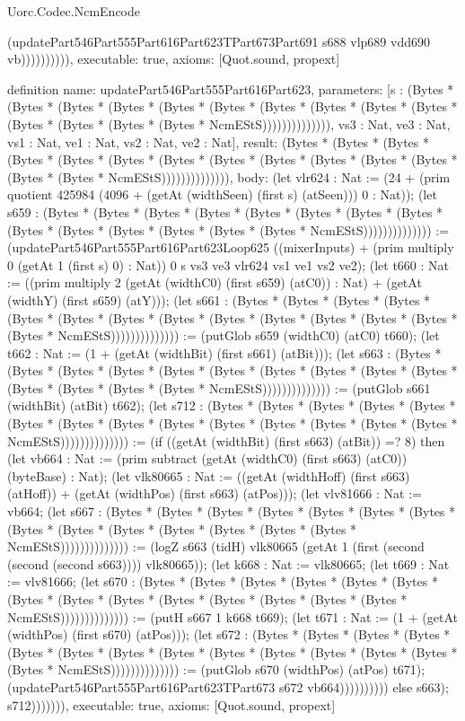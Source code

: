 \begin{lexlean}{Uorc.Codec.NcmEncode}
\begin{semanticmodule}
{(updatePart546Part555Part616Part623TPart673Part691 s688 vlp689 vdd690 vb)))))))))),
  executable: true,
  axioms: [Quot.sound, propext]
}

definition{
  name: updatePart546Part555Part616Part623,
  parameters: [s : (Bytes * (Bytes * (Bytes * (Bytes * (Bytes * (Bytes * (Bytes * (Bytes * (Bytes * (Bytes * (Bytes * (Bytes * (Bytes * (Bytes * NcmEStS)))))))))))))), vs3 : Nat, ve3 : Nat, vs1 : Nat, ve1 : Nat, vs2 : Nat, ve2 : Nat],
  result: (Bytes * (Bytes * (Bytes * (Bytes * (Bytes * (Bytes * (Bytes * (Bytes * (Bytes * (Bytes * (Bytes * (Bytes * (Bytes * (Bytes * NcmEStS)))))))))))))),
  body: (let vlr624 : Nat := (24 + (prim quotient 425984 (4096 + (getAt (widthSeen) (first s) (atSeen))) 0 : Nat)); (let s659 : (Bytes * (Bytes * (Bytes * (Bytes * (Bytes * (Bytes * (Bytes * (Bytes * (Bytes * (Bytes * (Bytes * (Bytes * (Bytes * (Bytes * NcmEStS)))))))))))))) := (updatePart546Part555Part616Part623Loop625 ((mixerInputs) + (prim multiply 0 (getAt 1 (first s) 0) : Nat)) 0 s vs3 ve3 vlr624 vs1 ve1 vs2 ve2); (let t660 : Nat := ((prim multiply 2 (getAt (widthC0) (first s659) (atC0)) : Nat) + (getAt (widthY) (first s659) (atY))); (let s661 : (Bytes * (Bytes * (Bytes * (Bytes * (Bytes * (Bytes * (Bytes * (Bytes * (Bytes * (Bytes * (Bytes * (Bytes * (Bytes * (Bytes * NcmEStS)))))))))))))) := (putGlob s659 (widthC0) (atC0) t660); (let t662 : Nat := (1 + (getAt (widthBit) (first s661) (atBit))); (let s663 : (Bytes * (Bytes * (Bytes * (Bytes * (Bytes * (Bytes * (Bytes * (Bytes * (Bytes * (Bytes * (Bytes * (Bytes * (Bytes * (Bytes * NcmEStS)))))))))))))) := (putGlob s661 (widthBit) (atBit) t662); (let s712 : (Bytes * (Bytes * (Bytes * (Bytes * (Bytes * (Bytes * (Bytes * (Bytes * (Bytes * (Bytes * (Bytes * (Bytes * (Bytes * (Bytes * NcmEStS)))))))))))))) := (if ((getAt (widthBit) (first s663) (atBit)) =? 8) then (let vb664 : Nat := (prim subtract (getAt (widthC0) (first s663) (atC0)) (byteBase) : Nat); (let vlk80665 : Nat := ((getAt (widthHoff) (first s663) (atHoff)) + (getAt (widthPos) (first s663) (atPos))); (let vlv81666 : Nat := vb664; (let s667 : (Bytes * (Bytes * (Bytes * (Bytes * (Bytes * (Bytes * (Bytes * (Bytes * (Bytes * (Bytes * (Bytes * (Bytes * (Bytes * (Bytes * NcmEStS)))))))))))))) := (logZ s663 (tidH) vlk80665 (getAt 1 (first (second (second (second s663)))) vlk80665)); (let k668 : Nat := vlk80665; (let t669 : Nat := vlv81666; (let s670 : (Bytes * (Bytes * (Bytes * (Bytes * (Bytes * (Bytes * (Bytes * (Bytes * (Bytes * (Bytes * (Bytes * (Bytes * (Bytes * (Bytes * NcmEStS)))))))))))))) := (putH s667 1 k668 t669); (let t671 : Nat := (1 + (getAt (widthPos) (first s670) (atPos))); (let s672 : (Bytes * (Bytes * (Bytes * (Bytes * (Bytes * (Bytes * (Bytes * (Bytes * (Bytes * (Bytes * (Bytes * (Bytes * (Bytes * (Bytes * NcmEStS)))))))))))))) := (putGlob s670 (widthPos) (atPos) t671); (updatePart546Part555Part616Part623TPart673 s672 vb664)))))))))) else s663); s712))))))),
  executable: true,
  axioms: [Quot.sound, propext]
}


\end{semanticmodule}
\end{lexlean}
